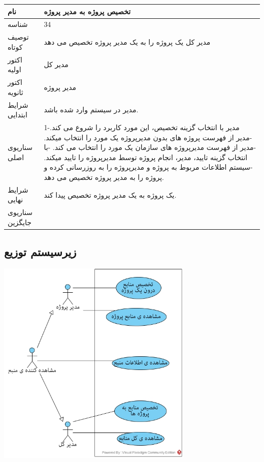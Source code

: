 \vspace{2cm}

\begin{tabular}{|p{2cm}|p{10cm}|}
\hline
نام
&
تخصیص پروژه به مدیر پروژه
\\
\hline
شناسه
&
34
\\
\hline
توصیف کوتاه
&
مدیر کل یک پروژه را به یک مدیر پروژه تخصیص می دهد
\\
\hline
اکتور اولیه
&
مدیر کل
\\
\hline
اکتور ثانویه
&
مدیر پروژه
\\
\hline
شرایط ابتدایی
&
مدیر در سیستم وارد شده باشد.
\\
\hline
سناریوی اصلی
&
1-مدیر با انتخاب گزینه تخصیص، این مورد کاربرد را شروع می کند.
\newline
2-مدیر از فهرست پروژه های بدون مدیرپروژه یک مورد را انتخاب میکند.
\newline
3-مدیر از فهرست مدیرپروژه های سازمان یک مورد را انتخاب می کند.
\newline
4-با انتخاب گزینه تایید، مدیر، انجام پروژه توسط مدیرپروژه را تایید میکند. 
\newline
5-سیستم اطلاعات مربوط به پروژه و مدیرپروژه را به روزرسانی کرده و پروژه را به مدیر پروژه تخصیص می دهد.
\\
\hline
شرایط نهایی
&
یک پروژه به یک مدیر پروژه تخصیص پیدا کند.
\\
\hline
سناریوی جایگزین
&

\\
\hline
\end{tabular}



\newpage
\subsection{زیرسیستم توزیع}

\vspace{2cm}
\begin{center}
\includegraphics[width=0.7\textwidth]{Diagrams/Resources.jpg}
\end{center}

